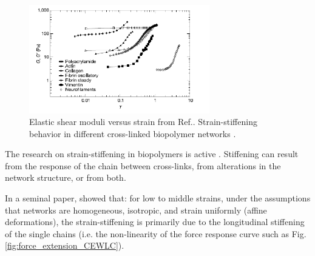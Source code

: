  \begin{figure}[ht]
\begin{center}
\includegraphics[width=0.7\textwidth,height=0.5\textwidth]{Figures/chapter-intro/strainstiffening_storm.png}%

\caption[Strain-stiffening in semiflexible
polymers]{ Elastic shear moduli versus
strain from Ref.\citep{storm_nonlinear_2005}. Strain-stiffening behavior in
different cross-linked biopolymer networks
\citep{carrillo_nonlinear_2013}.}
\label{fig:strainstiffening-storm}
\end{center}
\end{figure}


The research on strain-stiffening in biopolymers is
active \citep{head_distinct_2003,head_deformation_2003,huisman_three-dimensional_2007,onck_alternative_2005,storm_nonlinear_2005,wilhelm_elasticity_2003,yao_nonlinear_2011}.
Stiffening can result from the response of the chain between cross-links, from
alterations in the network structure, or from both.

 In a seminal paper,
\citet{storm_nonlinear_2005} showed that: for low to middle strains, under
the assumptions that networks are homogeneous, isotropic, and strain uniformly
(affine deformations), the strain-stiffening is primarily due to the
longitudinal stiffening of the single chains (i.e.
the non-linearity of the force response curve such as
Fig.\ref{fig:force_extension_CEWLC}).

